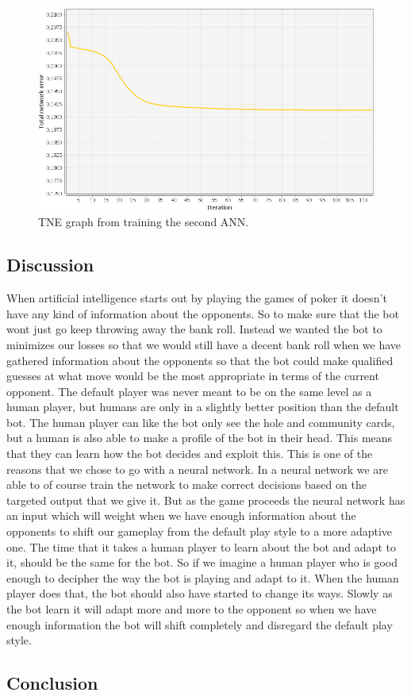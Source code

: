 \begin{figure}[H]
  \center
    \includegraphics[scale=0.6]{images/nn/default-nn2-err.png}
  \caption{TNE graph from training the second ANN.\label{fig:tneg2}}
\end{figure}

\subsection{Discussion}
When artificial intelligence starts out by playing the games of poker it doesn't have any kind of information about the opponents. So to make sure that the bot wont just go keep throwing away the bank roll. Instead we wanted the bot to minimizes our losses so that we would still have a decent bank roll when we have gathered information about the opponents so that the bot could make qualified guesses at what move would be the most appropriate in terms of the current opponent. The default player was never meant to be on the same level as a human player, but humans are only in a slightly better position than the default bot. The human player can like the bot only see the hole and community cards, but a human is also able to make a profile of the bot in their head. This means that they can learn how the bot decides and exploit this. 
This is one of the reasons that we chose to go with a neural network. In a neural network we are able to of course train the network to make correct decisions based on the targeted output that we give it.
But as the game proceeds the neural network has an input which will weight when we have enough information about the opponents to shift our gameplay from the default play style to a more adaptive one.
The time that it takes a human player to learn about the bot and adapt to it, should be the same for the bot. So if we imagine a human player who is good enough to decipher the way the bot is playing and adapt to it. When the human player does that, the bot should also have started to change its ways. Slowly as the bot learn it will adapt more and more to the opponent so when we have enough information the bot will shift completely and disregard the default play style.
\subsection{Conclusion}
